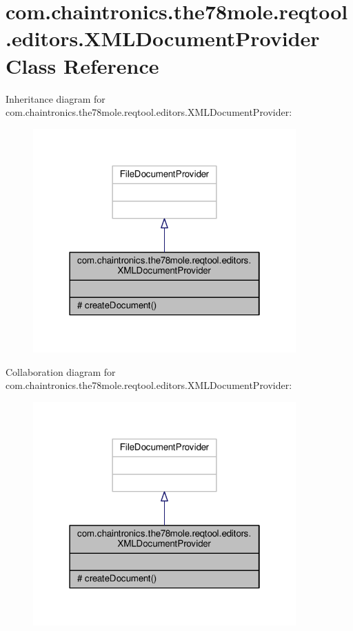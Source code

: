 \hypertarget{classcom_1_1chaintronics_1_1the78mole_1_1reqtool_1_1editors_1_1XMLDocumentProvider}{}\section{com.\+chaintronics.\+the78mole.\+reqtool.\+editors.\+X\+M\+L\+Document\+Provider Class Reference}
\label{classcom_1_1chaintronics_1_1the78mole_1_1reqtool_1_1editors_1_1XMLDocumentProvider}


Inheritance diagram for com.\+chaintronics.\+the78mole.\+reqtool.\+editors.\+X\+M\+L\+Document\+Provider\+:\nopagebreak
\begin{figure}[H]
\begin{center}
\leavevmode
\includegraphics[width=286pt]{dc/d69/classcom_1_1chaintronics_1_1the78mole_1_1reqtool_1_1editors_1_1XMLDocumentProvider__inherit__graph}
\end{center}
\end{figure}


Collaboration diagram for com.\+chaintronics.\+the78mole.\+reqtool.\+editors.\+X\+M\+L\+Document\+Provider\+:\nopagebreak
\begin{figure}[H]
\begin{center}
\leavevmode
\includegraphics[width=286pt]{d3/d8b/classcom_1_1chaintronics_1_1the78mole_1_1reqtool_1_1editors_1_1XMLDocumentProvider__coll__graph}
\end{center}
\end{figure}
